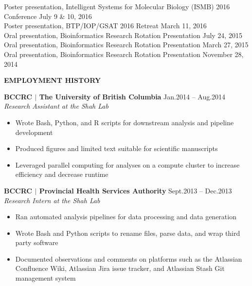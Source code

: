\documentclass{res}
\renewcommand{\section}[1]{%
  \vspace{0.3in}%
  \centerline{\uppercase{\bf{#1}}}%
  \vspace{-6pt}}
\newcommand{\linepresentation}[3]{%
  #3 \hfill #1\\[.75ex]}
\newcommand{\linehead}[2]{%
  {\bf #1} \hfill #2\\}
\newcommand{\linetitle}[1]{%
  {\sl #1}}
\begin{document}
\begin{resume}
\linepresentation{July 9 \& 10, 2016}{%
  Bioinformatic characterization of the normal thyroid reference epigenome}{%
  Poster presentation, Intelligent Systems for Molecular Biology (ISMB) 2016 Conference}
\linepresentation{March 11, 2016}{%
  Characterization of the normal reference thyroid epigenome}{%
  Poster presentation, BTP/IOP/GSAT 2016 Retreat}
\linepresentation{July 24, 2015}{%
  Literature-based knowledge discovery of Biomedical Text}{%
  Oral presentation, Bioinformatics Research Rotation Presentation}
\linepresentation{March 27, 2015}{%
  miRNA promoter recognition with CAGE and sRNA-seq}{%
  Oral presentation, Bioinformatics Research Rotation Presentation}
\linepresentation{November 28, 2014}{%
  Primer Data Extraction and Blast API}{%
  Oral presentation, Bioinformatics Research Rotation Presentation}
\vspace{-1.5em}

\section{Employment history}

\linehead{BCCRC $|$ The University of British Columbia}{Jan.2014 -- Aug.2014}
\linetitle{Research Assistant at the Shah Lab}
\begin{itemize}
  \item Wrote Bash, Python, and R scripts for downstream analysis and pipeline development
  \item Produced figures and limited text suitable for scientific manuscripts
  \item Leveraged parallel computing for analyses on a compute cluster to increase efficiency and decrease runtime
\end{itemize}

\linehead{BCCRC $|$ Provincial Health Services Authority}{Sept.2013 -- Dec.2013}
\linetitle{Research Intern at the Shah Lab}
\begin{itemize}
  \item Ran automated analysis pipelines for data processing and data generation
  \item Wrote Bash and Python scripts to rename files, parse data, and wrap third party software
  \item Documented observations and comments on platforms such as the Atlassian Confluence Wiki, Atlassian Jira issue tracker, and Atlassian Stash Git management system
\end{itemize}


\end{resume}
\end{document}
